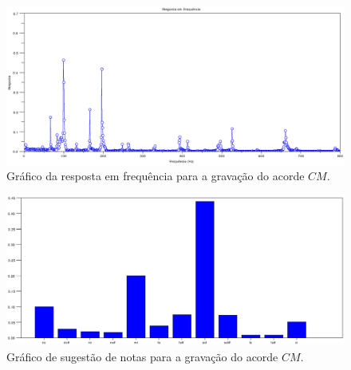 \begin{figure}[h]
	\centering
		\includegraphics[keepaspectratio=true,scale=0.49]{figuras/CM/fft_cm.eps}
	\caption{Gráfico da resposta em frequência para a gravação do acorde $CM$.}
  \label{fig:espectro_CM}
\end{figure}

\begin{figure}[h]
	\centering
		\includegraphics[keepaspectratio=true,scale=0.49]{figuras/CM/notas_cm.eps}
	\caption{Gráfico de sugestão de notas para a gravação do acorde $CM$.}
  \label{fig:notas_CM}
\end{figure}

